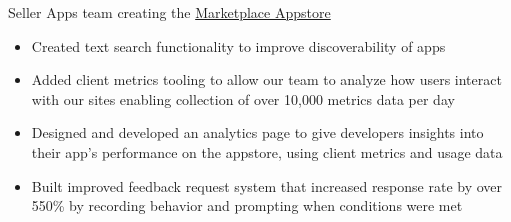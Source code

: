 \documentclass[11pt,letterpaper,ragged2e,withhyper]{altacv}
\newif\ifbubbles
\begin{document}
\begin{paracol}{2}








\switchcolumn


\par Seller Apps team creating the \href{https://sellercentral.amazon.com/apps/store}{\color{accent} Marketplace Appstore}
\smallskip
\begin{itemize}
    \item Created text search functionality to improve discoverability of apps
    \item Added client metrics tooling to allow our team to analyze how users interact with our sites enabling collection of over 10,000 metrics data per day
    \item Designed and developed an analytics page to give developers insights into their app's performance on the appstore, using client metrics and usage data
    \item Built improved feedback request system that increased response rate by over 550\% by recording behavior and prompting when conditions were met
\end{itemize}

\ifbubbles
    \cvtag{TypeScript}
    \cvtag{Java}
    \cvtag{React}
    \cvtag{Redux}
    \cvtag{AWS}
    \cvtag{Jest}
    \cvtag{Enzyme}
    \cvtag{REST}
\fi

\divider


\end{paracol}
\end{document}
